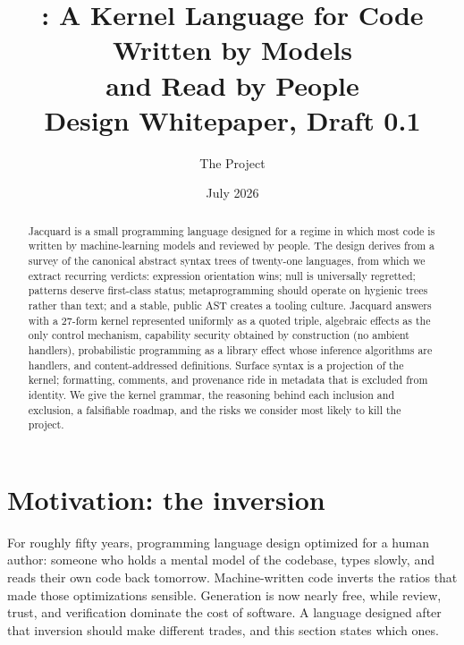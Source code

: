 \documentclass[11pt]{article}
\title{\textbf{\jacquard: A Kernel Language for Code Written by Models\\ and Read by People}\\[0.6em]
\large Design Whitepaper, Draft 0.1}
\author{The \jacquard{} Project}
\date{July 2026}
\newcommand{\jacquard}{Jacquard}
\begin{document}
\maketitle

\begin{center}
\end{center}

\begin{abstract}
\noindent
\jacquard{} is a small programming language designed for a regime in which most code is written by machine-learning models and reviewed by people. The design derives from a survey of the canonical abstract syntax trees of twenty-one languages, from which we extract recurring verdicts: expression orientation wins; null is universally regretted; patterns deserve first-class status; metaprogramming should operate on hygienic trees rather than text; and a stable, public AST creates a tooling culture. \jacquard{} answers with a 27-form kernel represented uniformly as a quoted triple, algebraic effects as the only control mechanism, capability security obtained by construction (no ambient handlers), probabilistic programming as a library effect whose inference algorithms are handlers, and content-addressed definitions. Surface syntax is a projection of the kernel; formatting, comments, and provenance ride in metadata that is excluded from identity. We give the kernel grammar, the reasoning behind each inclusion and exclusion, a falsifiable roadmap, and the risks we consider most likely to kill the project.
\end{abstract}

\section{Motivation: the inversion}
\label{sec:motivation}

For roughly fifty years, programming language design optimized for a human author: someone who holds a mental model of the codebase, types slowly, and reads their own code back tomorrow. Machine-written code inverts the ratios that made those optimizations sensible. Generation is now nearly free, while review, trust, and verification dominate the cost of software. A language designed after that inversion should make different trades, and this section states which ones.
\end{document}
